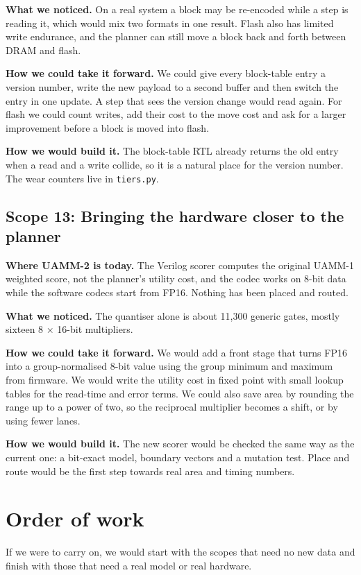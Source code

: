 \documentclass[12pt,a4paper]{report}
\begin{document}
\textbf{What we noticed.} On a real system a block may be re-encoded while a step is reading it, which would mix two formats in one result. Flash also has limited write endurance, and the planner can still move a block back and forth between DRAM and flash.

\textbf{How we could take it forward.} We could give every block-table entry a version number, write the new payload to a second buffer and then switch the entry in one update. A step that sees the version change would read again. For flash we could count writes, add their cost to the move cost and ask for a larger improvement before a block is moved into flash.

\textbf{How we would build it.} The block-table RTL already returns the old entry when a read and a write collide, so it is a natural place for the version number. The wear counters live in \texttt{tiers.\allowbreak{}py}.

\subsection{Scope 13: Bringing the hardware closer to the planner}
\textbf{Where UAMM-2 is today.} The Verilog scorer computes the original UAMM-1 weighted score, not the planner's utility cost, and the codec works on 8-bit data while the software codecs start from FP16. Nothing has been placed and routed.

\textbf{What we noticed.} The quantiser alone is about 11,300 generic gates, mostly sixteen 8 × 16-bit multipliers.

\textbf{How we could take it forward.} We would add a front stage that turns FP16 into a group-normalised 8-bit value using the group minimum and maximum from firmware. We would write the utility cost in fixed point with small lookup tables for the read-time and error terms. We could also save area by rounding the range up to a power of two, so the reciprocal multiplier becomes a shift, or by using fewer lanes.

\textbf{How we would build it.} The new scorer would be checked the same way as the current one: a bit-exact model, boundary vectors and a mutation test. Place and route would be the first step towards real area and timing numbers.

\section{Order of work}
If we were to carry on, we would start with the scopes that need no new data and finish with those that need a real model or real hardware.
\end{document}
